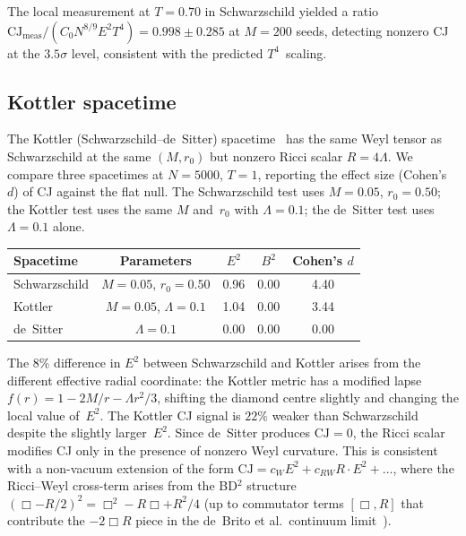 \documentclass[12pt,a4paper]{article}
\theoremstyle{plain}
\theoremstyle{definition}
\theoremstyle{remark}
\newcommand{\CJ}{\mathrm{CJ}}
\begin{document}
The local measurement at $T = 0.70$ in Schwarzschild yielded a
ratio $\CJ_{\mathrm{meas}} / (C_0 N^{8/9} E^2 T^4) =
0.998 \pm 0.285$ at $M = 200$ seeds, detecting nonzero CJ at the $3.5\sigma$ level, consistent
with the predicted $T^4$~scaling.

\subsection{Kottler spacetime}
\label{sec:kottler}

The Kottler (Schwarzschild--de~Sitter)
spacetime~\cite{Kottler:1918} has the same Weyl tensor as
Schwarzschild at the same $(M, r_0)$ but nonzero Ricci scalar
$R = 4\Lambda$.  We compare three spacetimes at $N = 5000$,
$T = 1$, reporting the effect size (Cohen's~$d$) of CJ against
the flat null.  The Schwarzschild test uses $M = 0.05$,
$r_0 = 0.50$; the Kottler test uses the same $M$ and~$r_0$ with
$\Lambda = 0.1$; the de~Sitter test uses $\Lambda = 0.1$ alone.

\begin{center}
\begin{tabular}{lcccc}
\toprule
Spacetime & Parameters & $E^2$ & $B^2$ & Cohen's $d$ \\
\midrule
Schwarzschild  & $M = 0.05$, $r_0 = 0.50$ & 0.96 & 0.00 & 4.40 \\
Kottler        & $M = 0.05$, $\Lambda = 0.1$ & 1.04 & 0.00 & 3.44 \\
de~Sitter      & $\Lambda = 0.1$ & 0.00 & 0.00 & 0.00 \\
\bottomrule
\end{tabular}
\end{center}

The $8\%$ difference in $E^2$ between Schwarzschild and Kottler
arises from the different effective radial coordinate: the Kottler
metric has a modified lapse $f(r) = 1 - 2M/r - \Lambda r^2/3$,
shifting the diamond centre slightly and changing the local
value of~$E^2$.  The Kottler CJ signal is $22\%$ weaker than
Schwarzschild despite the slightly larger~$E^2$.  Since de~Sitter produces $\CJ = 0$,
the Ricci scalar modifies CJ only in the presence of nonzero
Weyl curvature.  This is consistent with a non-vacuum extension
of the form $\CJ = c_W E^2 + c_{RW} R \cdot E^2 + \ldots$,
where the Ricci--Weyl cross-term arises from the BD${}^2$
structure $(\Box - R/2)^2 = \Box^2 - R\Box + R^2/4$
(up to commutator terms $[\Box, R]$ that contribute the
$-2\Box R$ piece in the de~Brito et al.\ continuum
limit~\cite{deBrito:2023}).
\end{document}
